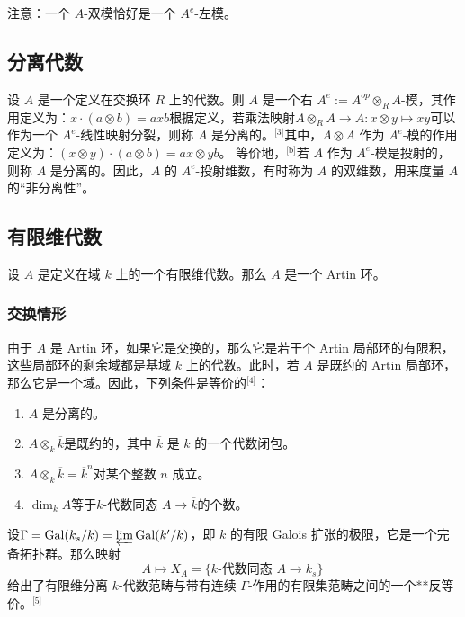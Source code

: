 注意：一个 $A$-双模恰好是一个 $A^e$-左模。
\subsection{分离代数}
设 $A$ 是一个定义在交换环 $R$ 上的代数。则 $A$ 是一个右 $A^e := A^{op} \otimes_R A$-模，其作用定义为：$x \cdot (a \otimes b) = a x b$根据定义，若乘法映射$A \otimes_R A \to A : x \otimes y \mapsto xy$可以作为一个 $A^e$-线性映射分裂，则称 $A$ 是分离的。\(^\text{[3]}\)其中，$A \otimes A$ 作为 $A^e$-模的作用定义为：$(x \otimes y) \cdot (a \otimes b) = a x \otimes y b$。
等价地，\(^\text{[b]}\)若 $A$ 作为 $A^e$-模是投射的，则称 $A$ 是分离的。因此，$A$ 的 $A^e$-投射维数，有时称为 $A$ 的双维数，用来度量 $A$ 的“非分离性”。
\subsection{有限维代数}
设 $A$ 是定义在域 $k$ 上的一个有限维代数。那么 $A$ 是一个 Artin 环。
\subsubsection{交换情形}
由于 $A$ 是 Artin 环，如果它是交换的，那么它是若干个 Artin 局部环的有限积，这些局部环的剩余域都是基域 $k$ 上的代数。此时，若 $A$ 是既约的 Artin 局部环，那么它是一个域。因此，下列条件是等价的\(^\text{[4]}\)：
\begin{enumerate}
\item $A$ 是分离的。
\item $A \otimes_k \overline{k}$是既约的，其中 $\overline{k}$ 是 $k$ 的一个代数闭包。
\item $A \otimes_k \overline{k} = \overline{k}^n$对某个整数 $n$ 成立。
\item $\dim_k A$等于$k\text{-代数同态 } A \to \overline{k}$的个数。
\end{enumerate}
设$\Gamma = \operatorname{Gal}(k_s / k) = \varprojlim \operatorname{Gal}(k'/k)$，即 $k$ 的有限 Galois 扩张的极限，它是一个完备拓扑群。那么映射
$$
A \mapsto X_A = \{k\text{-代数同态 } A \to k_s\}~
$$
给出了有限维分离 $k$-代数范畴与带有连续 $\Gamma$-作用的有限集范畴之间的一个**反等价。\(^\text{[5]}\)
